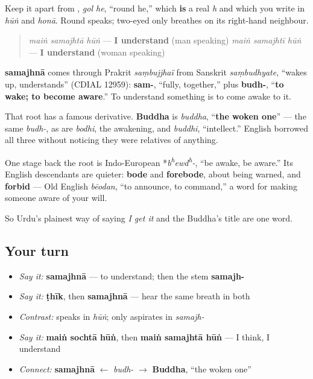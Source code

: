 Keep it apart from \textbf{}, \emph{gol he}, “round he,” which \textbf{is} a real \emph{h} and which you write in \emph{hūṅ} and \emph{honā}. Round \textbf{} speaks; two-eyed \textbf{} only breathes on its right-hand neighbour.

\begin{grammarlens}[title={Grammar Lens: into the frame}]
\begin{quote}
\emph{maiṅ samajhtā hūṅ} — \textbf{I understand} (man speaking) \emph{maiṅ samajhtī hūṅ} — \textbf{I understand} (woman speaking)
\end{quote}
\end{grammarlens}

\begin{cousinweb}
\textbf{samajhnā} comes through Prakrit \emph{saṃbujjhaï} from Sanskrit \emph{saṃbudhyate}, “wakes up, understands” (CDIAL 12959): \textbf{sam-}, “fully, together,” plus \textbf{budh-}, “\textbf{to wake; to become aware}.” To understand something is to come awake to it.

That root has a famous derivative. \textbf{Buddha} is \emph{buddha}, “\textbf{the woken one}” — the same \emph{budh-}, as are \emph{bodhi}, the awakening, and \emph{buddhi}, “intellect.” English borrowed all three without noticing they were relatives of anything.

One stage back the root is Indo-European *\emph{b\textsuperscript{h}ewd\textsuperscript{h}-}, “be awake, be aware.” Its English descendants are quieter: \textbf{bode} and \textbf{forebode}, about being warned, and \textbf{forbid} — Old English \emph{bēodan}, “to announce, to command,” a word for making someone aware of your will.

So Urdu's plainest way of saying \emph{I get it} and the Buddha's title are one word.
\end{cousinweb}

\subsection*{Your turn}
\begin{itemize}
\raggedright
  \item \emph{Say it:} \textbf{samajhnā} — to understand; then the stem \textbf{samajh-}
  \item \emph{Say it:} \textbf{ṭhīk}, then \textbf{samajhnā} — hear the same \textbf{} breath in both
  \item \emph{Contrast:} \textbf{} speaks in \emph{hūṅ}; \textbf{} only aspirates in \emph{samajh-}
  \item \emph{Say it:} \textbf{maiṅ sochtā hūṅ}, then \textbf{maiṅ samajhtā hūṅ} — I think, I understand
  \item \emph{Connect:} \textbf{samajhnā} $\leftarrow$ \emph{budh-} $\to$ \textbf{Buddha}, “the woken one”
\end{itemize}

